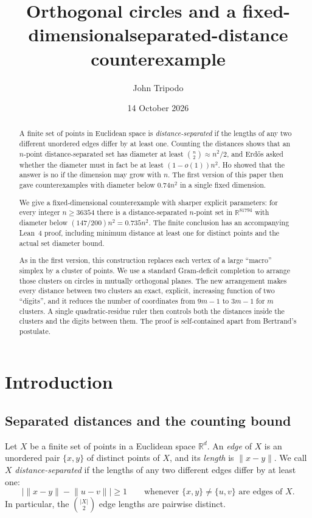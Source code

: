\documentclass[11pt]{amsart}
\title[Orthogonal circles and separated distances]{Orthogonal circles and a fixed-dimensional\newline separated-distance counterexample}
\author{John Tripodo}
\date{14 October 2026}
\numberwithin{equation}{section}
\theoremstyle{definition}
\theoremstyle{remark}
\newcommand{\R}{\mathbb R}
\newcommand{\norm}[1]{\lVert #1\rVert}
\begin{document}
\begin{abstract}
A finite set of points in Euclidean space is \emph{distance-separated} if
the lengths of any two different unordered edges differ by at least one. Counting the
distances shows that an $n$-point distance-separated set has diameter at
least $\binom n2\approx n^2/2$, and Erd\H{o}s asked whether the diameter
must in fact be at least $(1-o(1))n^2$. Ho showed that the answer is no if
the dimension may grow with $n$. The first version of this paper then gave
counterexamples with diameter below $0.74n^2$ in a single fixed dimension.

We give a fixed-dimensional counterexample with sharper explicit parameters:
for every integer $n\ge36354$ there is a distance-separated $n$-point
set in $\R^{81794}$ with diameter below $(147/200)n^2=0.735n^2$.
The finite conclusion has an accompanying Lean~4 proof, including minimum
distance at least one for distinct points and the actual set diameter bound.

As in the first version, this construction replaces each vertex of a large
``macro'' simplex by a cluster of points. We use a standard Gram-deficit
completion to arrange those clusters on circles in mutually orthogonal
planes. The new arrangement makes every distance between two clusters
an exact, explicit, increasing function of two ``digits'', and it
reduces the number of coordinates from $9m-1$ to $3m-1$ for $m$ clusters. A
single quadratic-residue ruler then controls both the distances inside the
clusters and the digits between them. The proof is self-contained apart from
Bertrand's postulate.
\end{abstract}

\maketitle

\section{Introduction}\label{sec:intro}

\subsection{Separated distances and the counting bound}

Let $X$ be a finite set of points in a Euclidean space $\R^d$. An
\emph{edge} of $X$ is an unordered pair $\{x,y\}$ of distinct points of $X$,
and its \emph{length} is $\norm{x-y}$. We call $X$
\emph{distance-separated} if the lengths of any two different edges differ
by at least one:
\begin{equation}\label{eq:separated}
 \bigl|\norm{x-y}-\norm{u-v}\bigr|\ge1
 \qquad\text{whenever }\{x,y\}\ne\{u,v\}\text{ are edges of }X.
\end{equation}
In particular, the $\binom{|X|}2$ edge lengths are pairwise distinct.
\end{document}
